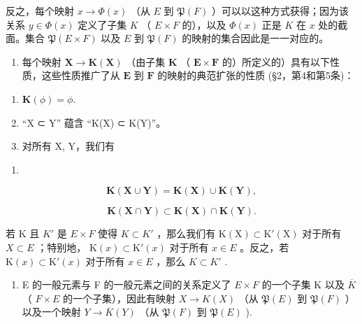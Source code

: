 反之，每个映射 \(x \to \Phi(x)\) （从 \(E\) 到 \(\mathfrak{P}(F)\) ）可以以这种方式获得；因为该关系 \(y \in \Phi(x)\) 定义了子集 \(K\) （ \(E \times F\) 的），以及 \(\Phi(x)\) 正是 \(K\) 在 \(x\) 处的截面。集合 \(\mathfrak{P}(E \times F)\) 以及 \(E\) 到 \(\mathfrak{P}(F)\) 的映射的集合因此是一一对应的。

\begin{enumerate}
\def\labelenumi{\arabic{enumi}.}
\setcounter{enumi}{7}
\tightlist
\item
  每个映射 \(\mathbf{X} \to \mathbf{K}(\mathbf{X})\) （由子集 \(\mathbf{K}\) （ \(\mathbf{E} \times \mathbf{F}\) 的）所定义的）具有以下性质，这些性质推广了从 \(\mathbf{E}\) 到 \(\mathbf{F}\) 的映射的典范扩张的性质 (§2，第4和第5条)：
\end{enumerate}

\begin{enumerate}
\def\labelenumi{(\alph{enumi})}
\item
  \(\mathbf{K}(\phi)=\phi.\)
\item
  “X ⊂ Y” 蕴含 “K(X) ⊂ K(Y)”。
\item
  对所有 X, Y，我们有
\end{enumerate}

\begin{enumerate}
\def\labelenumi{(\arabic{enumi})}
\setcounter{enumi}{27}
\tightlist
\item
\end{enumerate}

\[
\mathbf {K} (\mathbf {X} \cup \mathbf {Y}) = \mathbf {K} (\mathbf {X}) \cup \mathbf {K} (\mathbf {Y}),\tag{29}
\]

\[
\mathbf {K} (\mathbf {X} \cap \mathbf {Y}) \subset \mathbf {K} (\mathbf {X}) \cap \mathbf {K} (\mathbf {Y}).
\]

若 K 且 \(K'\) 是 \(E \times F\) 使得 \(K \subset K'\) ，那么我们有 \(\mathrm{K}(\mathrm{X}) \subset \mathrm{K}'(\mathrm{X})\) 对于所有 \(X \subset E\) ；特别地， \(\mathrm{K}(x) \subset \mathrm{K}'(x)\) 对于所有 \(x \in E\) 。反之，若 \(\mathrm{K}(x) \subset \mathrm{K}'(x)\) 对于所有 \(x \in E\) ，那么 \(K \subset K'\) .

\begin{enumerate}
\def\labelenumi{\arabic{enumi}.}
\setcounter{enumi}{8}
\tightlist
\item
  E 的一般元素与 F 的一般元素之间的关系定义了 \(E \times F\) 的一个子集 K 以及 \(\overline{K}\) （ \(F \times E\) 的一个子集），因此有映射 \(X \to K(X)\) （从 \(\mathfrak{P}(E)\) 到 \(\mathfrak{P}(F)\) ）以及一个映射 \(Y \to \overline{K}(Y)\) （从 \(\mathfrak{P}(F)\) 到 \(\mathfrak{P}(E)\) ).
\end{enumerate}

